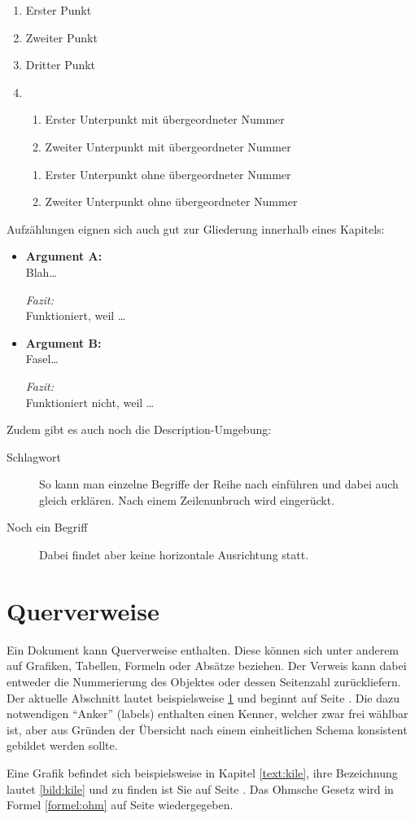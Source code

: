 \begin{enumerate}
\item Erster Punkt
\item Zweiter Punkt
\item Dritter Punkt
\item \begin{enumerate}
      \item Erster Unterpunkt mit übergeordneter Nummer
      \item Zweiter Unterpunkt mit übergeordneter Nummer
      \end{enumerate}
\begin{enumerate}
      \item Erster Unterpunkt ohne übergeordneter Nummer
      \item Zweiter Unterpunkt ohne übergeordneter Nummer
      \end{enumerate}
\end{enumerate}

Aufzählungen eignen sich auch gut zur Gliederung innerhalb
eines Kapitels:

\begin{itemize}
\item\textbf{Argument A:}\\
      Blah\ldots

      \emph{Fazit:}\\
      Funktioniert, weil \ldots
\item\textbf{Argument B:}\\
      Fasel\ldots

      \emph{Fazit:}\\
      Funktioniert nicht, weil \ldots
\end{itemize}

Zudem gibt es auch noch die Description-Umgebung:
\begin{description}
\item[Schlagwort]
      So kann man einzelne Begriffe der Reihe nach einführen und
      dabei auch gleich erklären. Nach einem Zeilenunbruch
      wird eingerückt.
\item[Noch ein Begriff]
      Dabei findet aber keine horizontale Ausrichtung statt.
\end{description}


\section{Querverweise}
\label{text:querverweise}
Ein Dokument kann Querverweise enthalten. Diese können sich unter anderem
auf Grafiken, Tabellen, Formeln oder Absätze beziehen. Der Verweis kann dabei
entweder die Nummerierung des Objektes oder dessen Seitenzahl zurückliefern.
Der aktuelle Abschnitt lautet
beispielsweise \ref{text:querverweise} und beginnt auf Seite \pageref{text:querverweise}.
Die dazu notwendigen "`Anker"' ({\ttfamily labels}) enthalten einen Kenner, welcher zwar
frei wählbar ist, aber aus Gründen der Übersicht nach einem einheitlichen Schema konsistent gebildet werden sollte.

Eine Grafik befindet sich beispielsweise in Kapitel \ref{text:kile}, ihre Bezeichnung
lautet \ref{bild:kile} und zu finden ist Sie auf Seite \pageref{bild:kile}.
Das Ohmsche Gesetz wird in Formel \ref{formel:ohm} auf Seite \pageref{formel:ohm}
wiedergegeben.
